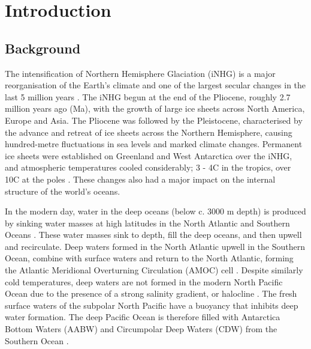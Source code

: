 \section{Introduction}

\subsection{Background}

The intensification of Northern Hemisphere Glaciation (iNHG) is a major reorganisation of the Earth's climate and one of the largest secular changes in the last 5 million years \citep{driscollShortCircuitThermohaline1998, bartoliFinalClosurePanama2005}. The iNHG begun at the end of the Pliocene, roughly 2.7 million years ago (Ma), with the growth of large ice sheets across North America, Europe and Asia. The Pliocene was followed by the Pleistocene, characterised by the advance and retreat of ice sheets across the Northern Hemisphere, causing hundred-metre fluctuations in sea levels and marked climate changes. Permanent ice sheets were established on Greenland and West Antarctica over the iNHG, and atmospheric temperatures cooled considerably; 3 - 4\textdegree C in the tropics, over 10\textdegree C at the poles \citep{raymoInitiationNorthernHemisphere1994}. These changes also had a major impact on the internal structure of the world's oceans.

In the modern day, water in the deep oceans (below c. 3000 m depth) is produced by sinking water masses at high latitudes in the North Atlantic and Southern Oceans \citep{talleyClosureGlobalOverturning2013}. These water masses sink to depth, fill the deep oceans, and then upwell and recirculate. Deep waters formed in the North Atlantic upwell in the Southern Ocean, combine with surface waters and return to the North Atlantic, forming the Atlantic Meridional Overturning Circulation (AMOC) cell \citep{talleyChapterAtlanticOcean2011}. Despite similarly cold temperatures, deep waters are not formed in the modern North Pacific Ocean due to the presence of a strong salinity gradient, or halocline \citep{warrenWhyNoDeep1983}. The fresh surface waters of the subpolar North Pacific have a buoyancy that inhibits deep water formation. The deep Pacific Ocean is therefore filled with Antarctica Bottom Waters (AABW) and Circumpolar Deep Waters (CDW) from the Southern Ocean \citep{talleyClosureGlobalOverturning2013}.

